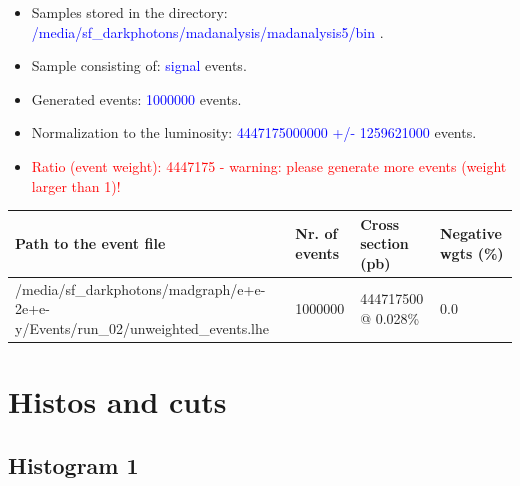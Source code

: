 \documentclass[a4paper, 11pt]{article}
\begin{document}
\begin{itemize}
  \item Samples stored in the directory: \textcolor{blue}{/\-media/\-sf\_darkphotons/\-madanalysis/\-madanalysis5/\-bin} .
   \item Sample consisting of: \textcolor{blue}{signal}  events.
   \item Generated events: \textcolor{blue}{1000000 }  events.
   \item Normalization to the luminosity: \textcolor{blue}{4447175000000}\textcolor{blue}{ +/\-- }\textcolor{blue}{1259621000 }  events.
   \item\textcolor{red}{Ratio (event weight): }\textcolor{red}{4447175 }\textcolor{red}{ - warning: please generate more events (weight larger than 1)!}
\textcolor{red}{}
\end{itemize}
\begin{table}[!h]
  \begin{center}
    \begin{tabular}{|m{51.0mm}|m{24.0mm}|m{28.0mm}|m{28.0mm}|}
      \hline
      \cellcolor{yellow}         Path to the event file& \cellcolor{yellow}         Nr. of events& \cellcolor{yellow}         Cross section (pb)& \cellcolor{yellow}         Negative wgts (\%)\\
      \hline
      \cellcolor{white}          /\-media/\-sf\_darkphotons/\-madgraph/\-e+e-2e+e-y/\-Events/\-run\_02/\-unweighted\_events.lhe& \cellcolor{white}          1000000& \cellcolor{white}          444717500 @ 0.028\%& \cellcolor{white}          0.0\\
\hline
    \end{tabular}
  \end{center}
\end{table}

\newpage
\section{ Histos and cuts}

\subsection{ Histogram 1}
\end{document}
